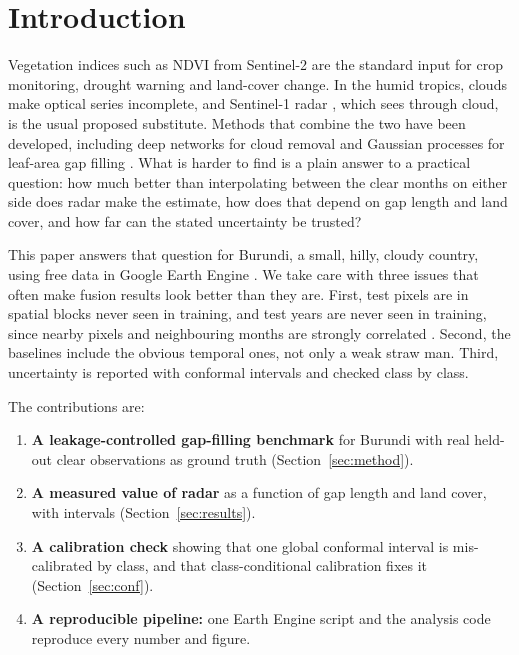 \documentclass[conference]{IEEEtran}
\begin{document}
\section{Introduction}

Vegetation indices such as NDVI from Sentinel-2 \cite{drusch2012s2} are the standard input for crop monitoring, drought warning and land-cover change. In the humid tropics, clouds make optical series incomplete, and Sentinel-1 radar \cite{torres2012s1}, which sees through cloud, is the usual proposed substitute. Methods that combine the two have been developed, including deep networks for cloud removal \cite{meraner2020cloud} and Gaussian processes for leaf-area gap filling \cite{pipia2019fusing}. What is harder to find is a plain answer to a practical question: how much better than interpolating between the clear months on either side does radar make the estimate, how does that depend on gap length and land cover, and how far can the stated uncertainty be trusted?

This paper answers that question for Burundi, a small, hilly, cloudy country, using free data in Google Earth Engine \cite{gorelick2017gee}. We take care with three issues that often make fusion results look better than they are. First, test pixels are in spatial blocks never seen in training, and test years are never seen in training, since nearby pixels and neighbouring months are strongly correlated \cite{roberts2017cv}. Second, the baselines include the obvious temporal ones, not only a weak straw man. Third, uncertainty is reported with conformal intervals \cite{lei2018distribution} and checked class by class.

The contributions are:
\begin{enumerate}
\item \textbf{A leakage-controlled gap-filling benchmark} for Burundi with real held-out clear observations as ground truth (Section~\ref{sec:method}).
\item \textbf{A measured value of radar} as a function of gap length and land cover, with intervals (Section~\ref{sec:results}).
\item \textbf{A calibration check} showing that one global conformal interval is mis-calibrated by class, and that class-conditional calibration fixes it (Section~\ref{sec:conf}).
\item \textbf{A reproducible pipeline:} one Earth Engine script and the analysis code reproduce every number and figure.
\end{enumerate}
\end{document}
